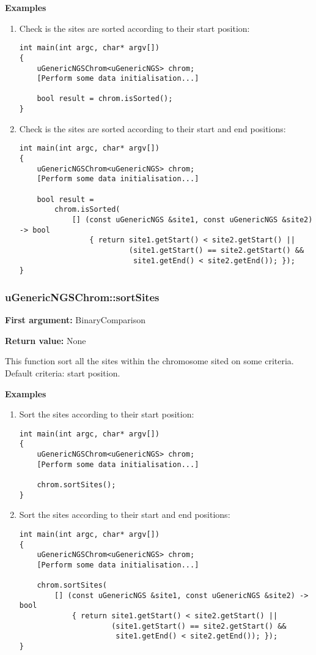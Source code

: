 \documentclass[letterpaper,10pt]{article}
\begin{document}
\bigskip
\noindent{}\textbf{Examples}
\begin{enumerate}
 \item Check is the sites are sorted according to their start position:
\begin{verbatim}
int main(int argc, char* argv[])
{
    uGenericNGSChrom<uGenericNGS> chrom;
    [Perform some data initialisation...]

    bool result = chrom.isSorted();
}
\end{verbatim}

 \item Check is the sites are sorted according to their start and end positions:
\begin{verbatim}
int main(int argc, char* argv[])
{
    uGenericNGSChrom<uGenericNGS> chrom;
    [Perform some data initialisation...]

    bool result = 
        chrom.isSorted(
            [] (const uGenericNGS &site1, const uGenericNGS &site2) -> bool
                { return site1.getStart() < site2.getStart() || 
                         (site1.getStart() == site2.getStart() && 
                          site1.getEnd() < site2.getEnd()); });
}
\end{verbatim}
\end{enumerate}

\subsubsection{uGenericNGSChrom::sortSites}
\textbf{First argument:} BinaryComparison

\noindent{}\textbf{Return value:} None

\bigskip
\noindent{}This function sort all the sites within the chromosome sited on some criteria. Default criteria: start position.

\bigskip
\noindent{}\textbf{Examples}
\begin{enumerate}
 \item Sort the sites according to their start position:
\begin{verbatim}
int main(int argc, char* argv[])
{
    uGenericNGSChrom<uGenericNGS> chrom;
    [Perform some data initialisation...]

    chrom.sortSites();
}
\end{verbatim}

 \item Sort the sites according to their start and end positions:
\begin{verbatim}
int main(int argc, char* argv[])
{
    uGenericNGSChrom<uGenericNGS> chrom;
    [Perform some data initialisation...]

    chrom.sortSites(
        [] (const uGenericNGS &site1, const uGenericNGS &site2) -> bool
            { return site1.getStart() < site2.getStart() || 
                     (site1.getStart() == site2.getStart() && 
                      site1.getEnd() < site2.getEnd()); });
}
\end{verbatim}
\end{enumerate}
\end{document}
